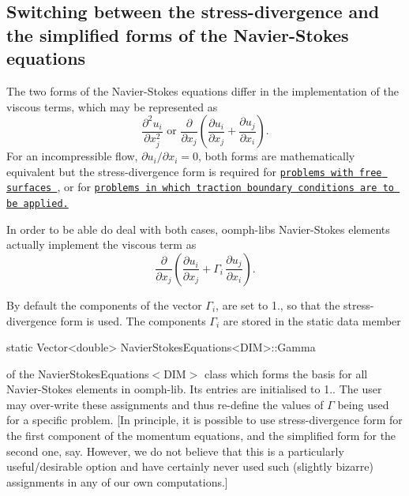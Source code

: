 \hypertarget{index_stress_divergence}{}\subsection{Switching between the stress-\/divergence and the simplified forms of the Navier-\/\+Stokes equations}\label{index_stress_divergence}
The two forms of the Navier-\/\+Stokes equations differ in the implementation of the viscous terms, which may be represented as \[ \frac{\partial^2 u_i}{\partial x_j^2} \mbox{ \ \ \ or \ \ \ } \frac{\partial }{\partial x_j} \left( \frac{\partial u_i}{\partial x_j} + \frac{\partial u_j}{\partial x_i} \right). \] For an incompressible flow, $ \partial u_i/\partial x_i = 0$, both forms are mathematically equivalent but the stress-\/divergence form is required for \href{../../single_layer_free_surface/html/index.html}{\tt problems with free surfaces }, or for \href{../../rayleigh_traction_channel//html/index.html}{\tt problems in which traction boundary conditions are to be applied.}

In order to be able do deal with both cases, {\ttfamily oomph-\/lib\textquotesingle{}s} Navier-\/\+Stokes elements actually implement the viscous term as \[ \frac{\partial }{\partial x_j} \left( \frac{\partial u_i}{\partial x_j} + \Gamma_i \, \frac{\partial u_j}{\partial x_i} \right). \]

By default the components of the vector $ \Gamma_i $, are set to 1., so that the stress-\/divergence form is used. The components $ \Gamma_i $ are stored in the static data member 
\begin{DoxyCode}
\textcolor{keyword}{static} Vector<double> NavierStokesEquations<DIM>::Gamma
\end{DoxyCode}
 of the {\ttfamily Navier\+Stokes\+Equations$<$\+D\+I\+M$>$} class which forms the basis for all Navier-\/\+Stokes elements in {\ttfamily oomph-\/lib}. Its entries are initialised to 1.. The user may over-\/write these assignments and thus re-\/define the values of $ \Gamma $ being used for a specific problem. \mbox{[}In principle, it is possible to use stress-\/divergence form for the first component of the momentum equations, and the simplified form for the second one, say. However, we do not believe that this is a particularly useful/desirable option and have certainly never used such (slightly bizarre) assignments in any of our own computations.\mbox{]}



 

